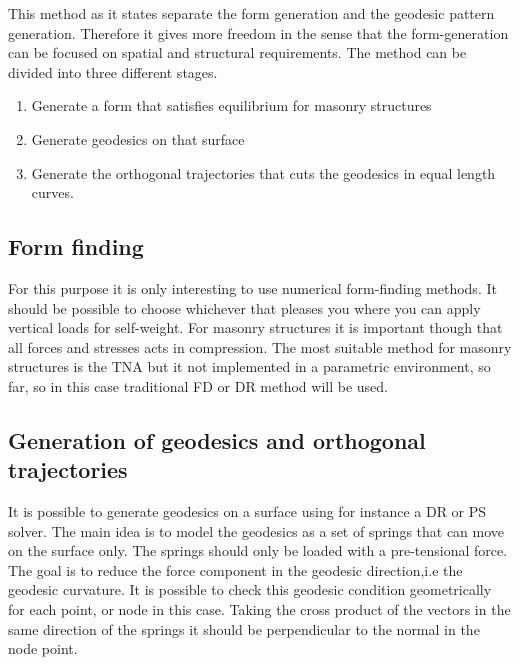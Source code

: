 This method as it states separate the form generation and the geodesic pattern generation. Therefore it gives more freedom in the sense that the form-generation can be focused on spatial and structural requirements. The method can be divided into three different stages.

\begin{enumerate}
\item Generate a form that satisfies equilibrium for masonry structures
\item Generate geodesics on that surface
\item Generate the orthogonal trajectories that cuts the geodesics in equal length curves. 
\end{enumerate}

\subsection{Form finding}
For this purpose it is only interesting to use numerical form-finding methods. It should be possible to choose whichever that pleases you where you can apply vertical loads for self-weight. For masonry structures it is important though that all forces and stresses acts in compression. The most suitable method for masonry structures is the TNA but it not implemented in a parametric environment, so far, so in this case traditional FD or DR method will be used.
\subsection{Generation of geodesics and orthogonal trajectories}

It is possible to generate geodesics on a surface using for instance a DR or PS solver. The main idea is to model the geodesics as a set of springs that can move on the surface only. The springs should only be loaded with a pre-tensional force. The goal is to reduce the force component in the geodesic direction,i.e the geodesic curvature. It is possible to check this geodesic condition geometrically for each point, or node in this case. Taking the cross product of the vectors in the same direction of the springs it should be perpendicular to the normal in the node point. 




